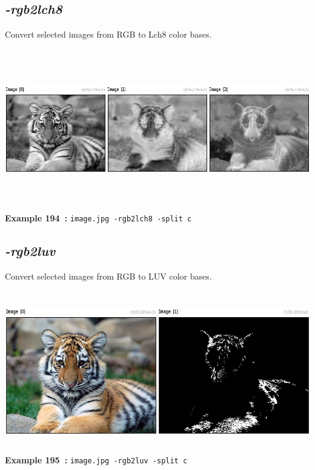 \documentclass[a4paper,11pt,twoside]{book}
\begin{document}
\subsection{\emph{-rgb2lch8} }\vspace*{-0.5em}
Convert selected images from RGB to Lch8 color bases.
\begin{center}\includegraphics[keepaspectratio=true,height=7cm,width=\textwidth]{img/gmic_def194.jpg}\\
{\footnotesize \textbf{Example 194~:} \texttt{image.jpg -rgb2lch8 -split c}}
\end{center}

\subsection{\emph{-rgb2luv} }\vspace*{-0.5em}
Convert selected images from RGB to LUV color bases.
\begin{center}\includegraphics[keepaspectratio=true,height=7cm,width=\textwidth]{img/gmic_def195.jpg}\\
{\footnotesize \textbf{Example 195~:} \texttt{image.jpg -rgb2luv -split c}}
\end{center}
\end{document}
